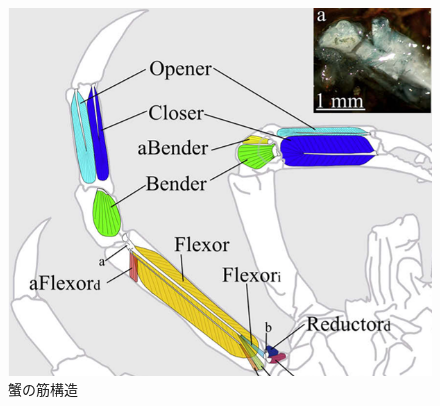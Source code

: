 \documentclass{jarticle}
\begin{document}
\begin{figure}[t]
\begin{minipage}[b]{0.47\columnwidth}
    \includegraphics[scale=0.26]{kani6.PNG}
    \vspace{-2mm}
    \caption{蟹の筋構造\cite{crab}}
    \label{fig:mus}
  \end{minipage}
\end{figure}
\end{document}
